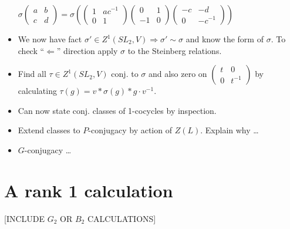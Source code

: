 \begin{itemize}
$\sigma\left(\begin{matrix}a&b\\c&d\end{matrix}\right) =
\sigma\left(
\left(\begin{matrix}1&ac^{-1}\\0&1\end{matrix}\right)
\left(\begin{matrix}0&1\\-1&0\end{matrix}\right)
\left(\begin{matrix}-c&-d\\0&-c^{-1}\end{matrix}\right)
\right)$
\item We now have fact $\sigma'\in Z^1(SL_2, V) \Rightarrow \sigma'\sim\sigma$ and know the form of $\sigma$. To check ``$\Leftarrow$'' direction apply $\sigma$ to the Steinberg relations.
\item Find all $\tau\in Z^1(SL_2, V)$ conj. to $\sigma$ and also zero on $\left(\begin{matrix}t & 0 \\ 0 & t^{-1}\end{matrix}\right)$ by calculating $\tau(g) = v*\sigma(g)*g\cdot v^{-1}$.
\item Can now state conj. classes of 1-cocycles by inspection.
\item Extend classes to $P$-conjugacy by action of $Z(L)$. Explain why \ldots
\item $G$-conjugacy \ldots
\end{itemize}


\section{A rank 1 calculation}

[INCLUDE $G_2$ OR $B_2$ CALCULATIONS]

